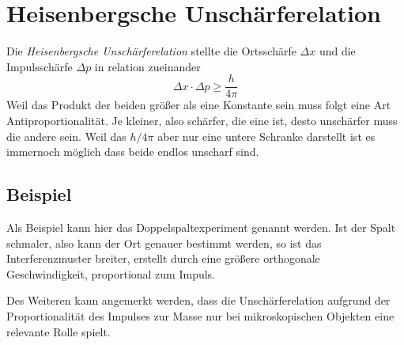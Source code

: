 \documentclass{article}
\begin{document}
\section{Heisenbergsche Unschärferelation}
Die \emph{Heisenbergsche Unschärferelation} stellte die Ortsschärfe $\Delta x$ und die Impulsschärfe $\Delta p$ in relation zueinander
\[
 \Delta x \cdot \Delta p \ge \frac{h}{4\pi} 
\]
Weil das Produkt der beiden größer als eine Konstante sein muss folgt eine Art Antiproportionalität. Je kleiner, also schärfer, die eine ist, desto unschärfer muss die andere sein. Weil das $h/4\pi$ aber nur eine untere Schranke darstellt ist es immernoch möglich dass beide endlos unscharf sind.
 
\subsection{Beispiel} 
Als Beispiel kann hier das Doppelspaltexperiment genannt werden. Ist der Spalt schmaler, also kann der Ort genauer bestimmt werden, so ist das Interferenzmuster breiter, erstellt durch eine größere orthogonale Geschwindigkeit, proportional zum Impuls.
 
Des Weiteren kann angemerkt werden, dass die Unschärferelation aufgrund der Proportionalität des Impulses zur Masse nur bei mikroskopischen Objekten eine relevante Rolle spielt.
\end{document}
